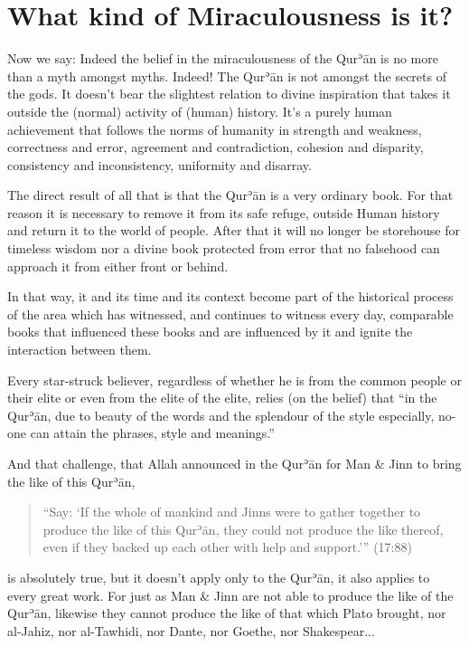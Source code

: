 \documentclass[12pt]{memoir}
\def\´{ʾ} %
\def \Quran{Qur\-\´ān} %
\let \Qrn=\Quran      %
\newcommand{\QRef}[1]{{\color{darkblue}#1}}
\begin{document}


\section{What kind of Miraculousness is it?}

Now we say: Indeed the belief in the miraculousness of the \Qrn{} is no more
than a myth amongst myths. Indeed! The \Qrn{} is not amongst the secrets of the
gods. It doesn’t bear the slightest relation to divine inspiration that takes
it outside the (normal) activity of (human) history. It’s a purely human
achievement that follows the norms of humanity in strength and weakness,
correctness and error, agreement and contradiction, cohesion and disparity,
consistency and inconsistency, uniformity and disarray.

The direct result of all that is that the \Qrn{} is a very ordinary book. For
that reason it is necessary to remove it from its safe refuge, outside Human
history and return it to the world of people. After that it will no longer be
storehouse for timeless wisdom nor a divine book protected from error that no
falsehood can approach it from either front or behind.

In that way, it and its time and its context become part of the historical
process of the area which has witnessed, and continues to witness every day,
comparable books that influenced these books and are influenced by it and
ignite the interaction between them.

Every star-struck believer, regardless of whether he is from the common people
or their elite or even from the elite of the elite, relies (on the belief) that
“in the \Quran, due to beauty of the words and the splendour of the style
especially, no-one can attain the phrases, style and meanings.”\footnotemark


And that challenge, that Allah announced in the \Qrn{} for Man \& Jinn to bring
the like of this \Quran,

\begin{quote}
“Say: ‘If the whole of mankind and Jinns were to gather together
to produce the like of this \Quran, they could not produce the like thereof,
even if they backed up each other with help and support.’” (\QRef{17:88})
\end{quote}

is absolutely true, but it doesn’t apply only to the \Quran, it also applies to
every great work. For just as Man \& Jinn are not able to produce the like of
the \Quran, likewise they cannot produce the like of that which Plato brought,
nor al-Jahiz, nor al-Tawhidi, nor Dante, nor Goethe, nor Shakespear...
\end{document}
